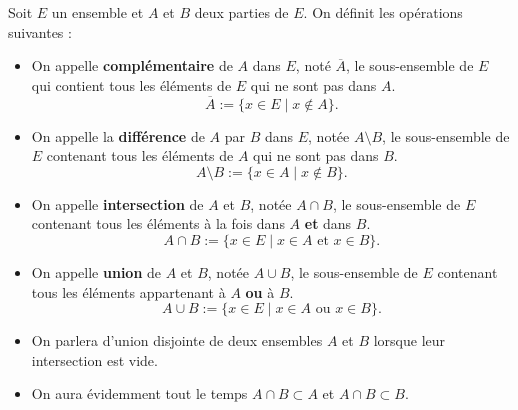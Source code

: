 \begin{definition}[Opérations]
    Soit $E$ un ensemble et $A$ et $B$ deux parties de $E$. On définit les opérations suivantes : 
    \begin{itemize}
        \item On appelle \textbf{complémentaire} de $A$ dans $E$, noté $\overline{A}$, le sous-ensemble de $E$ 
        qui contient tous les éléments de $E$ qui ne sont pas dans $A$. 
            \[ \overline{A} := \{ x \in E \; | \; x \notin A \}. \] 
        \item On appelle la \textbf{différence} de $A$ par $B$ dans $E$, notée $A \setminus B$, le sous-ensemble de $E$ 
            contenant tous les éléments de $A$ qui ne sont pas dans $B$. 
            \[ A \setminus B := \{ x \in A \; | \; x \notin B \}. \] 
        \item On appelle \textbf{intersection} de $A$ et $B$, notée $A \cap B$, le sous-ensemble de $E$ 
            contenant tous les éléments à la fois dans $A$ \textbf{et} dans $B$. 
                \[ A \cap B := \{ x \in E \; | \; x \in A \text{ et } x \in B \}. \] 
        \item On appelle \textbf{union} de $A$ et $B$, notée $A \cup B$, le sous-ensemble de $E$ 
            contenant tous les éléments appartenant à $A$ \textbf{ou} à $B$. 
                \[ A \cup B := \{ x \in E \; | \; x \in A \text{ ou } x \in B \}. \] 
    \end{itemize}
\end{definition}

\begin{proposition}
    \begin{itemize}
        \item On parlera d'union disjointe de deux ensembles $A$ et $B$ lorsque leur intersection est vide. 
        \item On aura évidemment tout le temps $A \cap B \subset A$ et $A \cap B \subset B$. 
    \end{itemize}
\end{proposition}


